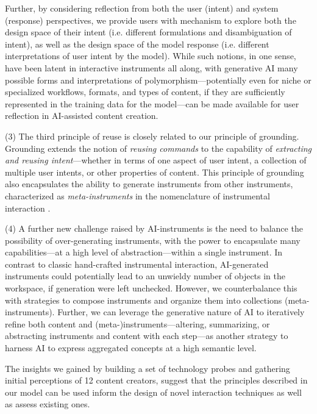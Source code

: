 Further, by considering reflection from both the user (intent) and system (response) perspectives, we provide users with mechanism to explore both the design space of their intent (i.e. different formulations and disambiguation of intent), as well as the design space of the model response (i.e. different interpretations of user intent by the model). While such notions, in one sense, have been latent in interactive instruments all along, with generative AI many possible forms and interpretations of polymorphism---potentially even for niche or specialized workflows, formats, and types of content, if they are sufficiently represented in the training data for the model---can be made available for user reflection in AI-assisted content creation. 



(3) The third principle of reuse is closely related to our principle of grounding. Grounding extends the notion of \textit{reusing commands} to the capability of \textit{extracting and reusing intent}---whether in terms of one aspect of user intent, a collection of multiple user intents, or other properties of content. This principle of grounding also encapsulates the ability to generate instruments from other instruments, characterized as \textit{meta-instruments} in the nomenclature of instrumental interaction \cite{beaudouin2000instrumental, beaudouin2000reification}. 


(4) A further new challenge raised by AI-instruments is the need to balance the possibility of over-generating instruments, with the power to encapsulate many capabilities---at a high level of abstraction---within a single instrument. In contrast to classic hand-crafted instrumental interaction, AI-generated instruments could potentially lead to an unwieldy number of objects in the workspace, if generation were left unchecked. However, we counterbalance this with strategies to compose instruments and organize them into collections (meta-instruments). Further, we can leverage the generative nature of AI to iteratively refine both content and (meta-)instruments---altering, summarizing, or abstracting instruments and content with each step---as another strategy to harness AI to express aggregated concepts at a high semantic level.



The insights we gained by building a set of technology probes and gathering initial perceptions of 12 content creators, suggest that the principles described in our model can be used inform the design of novel interaction techniques as well as assess existing ones. 

